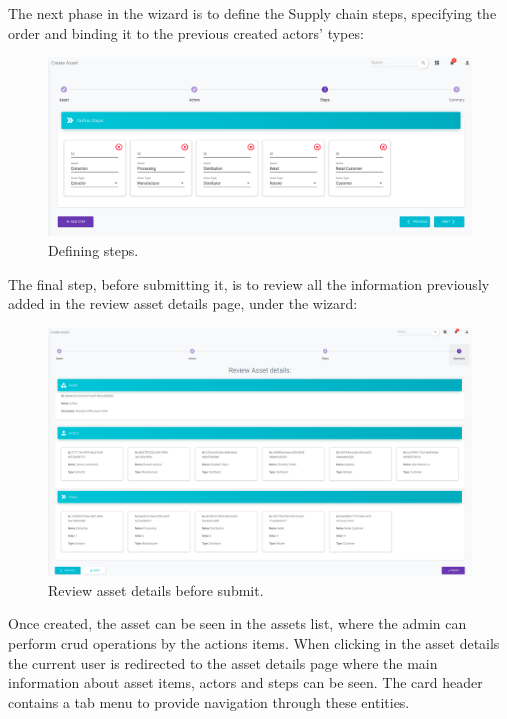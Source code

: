 The next phase in the wizard is to define the Supply chain steps, specifying the order and binding it to the previous created actors' types:

\begin{figure}[H]
\begin{center}
  \includegraphics[scale=0.27]{images/use_example/03_create_asset_3.png}
\caption{Defining steps.}
\label{fig:create_asset_3}
\end{center}
\end{figure}

The final step, before submitting it, is to review all the information previously added in the review asset details page, under the wizard:
\begin{figure}[H]
\begin{center}
  \includegraphics[scale=0.265]{images/use_example/04_create_asset_4.png}
\caption{Review asset details before submit.}
\label{fig:create_asset_4}
\end{center}
\end{figure}


Once created, the asset can be seen in the assets list, where the admin can perform crud operations by the actions items. When clicking in the asset details the current user is redirected to the asset details page where the main information about asset items, actors and steps can be seen. The card header contains a tab menu to provide navigation through these entities. 



